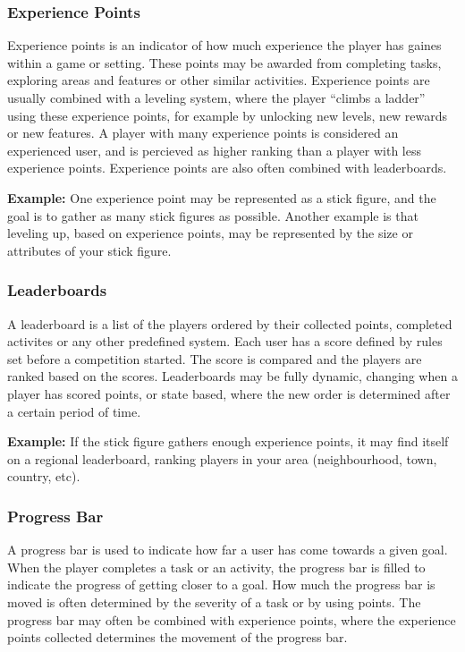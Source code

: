\subsubsection{Experience Points}
Experience points is an indicator of how much experience the player has gaines within a game or setting. These points may be awarded from completing tasks, exploring areas and features or other similar activities. Experience points are usually combined with a leveling system, where the player ``climbs a ladder'' using these experience points, for example by unlocking new levels, new rewards or new features. A player with many experience points is considered an experienced user, and is percieved as higher ranking than a player with less experience points. Experience points are also often combined with leaderboards. 

\textbf{Example:} One experience point may be represented as a stick figure, and the goal is to gather as many stick figures as possible. Another example is that leveling up, based on experience points, may be represented by the size or attributes of your stick figure.

\subsubsection{Leaderboards}
A leaderboard is a list of the players ordered by their collected points, completed activites or any other predefined system. Each user has a score defined by rules set before a competition started. The score is compared and the players are ranked based on the scores. Leaderboards may be fully dynamic, changing when a player has scored points, or state based, where the new order is determined after a certain period of time.

\textbf{Example:} If the stick figure gathers enough experience points, it may find itself on a regional leaderboard, ranking players in your area (neighbourhood, town, country, etc). 

\subsubsection{Progress Bar}
A progress bar is used to indicate how far a user has come towards a given goal. When the player completes a task or an activity, the progress bar is filled to indicate the progress of getting closer to a goal. How much the progress bar is moved is often determined by the severity of a task or by using points. The progress bar may often be combined with experience points, where the experience points collected determines the movement of the progress bar. 

